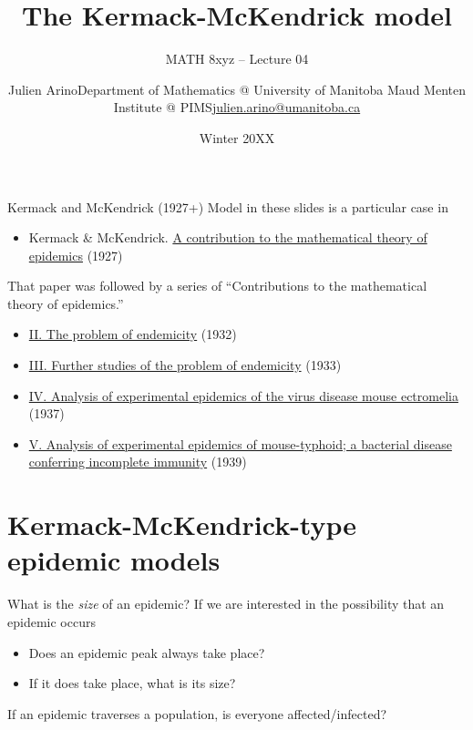 \documentclass[aspectratio=169]{beamer}\usepackage[]{graphicx}\usepackage[]{xcolor}
\title{The Kermack-McKendrick model}
\subtitle{MATH 8xyz -- Lecture 04}
\author{\texorpdfstring{Julien Arino\newline Department of Mathematics @ University of Manitoba \newline Maud Menten Institute @ PIMS\newline\url{julien.arino@umanitoba.ca}}{Julien Arino}}
\date{Winter 20XX}
\begin{document}


\begin{frame}{Kermack and McKendrick (1927+)}
Model in these slides is a particular case in
\begin{itemize}
  \item Kermack \& McKendrick. \href{https://doi.org/10.1098/rspa.1927.0118}{A contribution to the mathematical theory of epidemics} (1927) \end{itemize}
\vfill
That paper was followed by a series of ``Contributions to the mathematical theory of epidemics.''
\begin{itemize}
  \item \href{https://doi.org/10.1098/rspa.1932.0171}{II. The problem of endemicity} (1932)
  \item \href{https://doi.org/10.1098/rspa.1933.0106}{III. Further studies of the problem of endemicity} (1933) \nocite{KermackMcKendrick1932}
  \item \href{https://doi.org/10.1017/S0022172400034902}{IV. Analysis of experimental epidemics of the virus disease mouse ectromelia} (1937)
  \item \href{https://doi.org/10.1017/S0022172400011918}{V. Analysis of experimental epidemics of mouse-typhoid; a bacterial disease conferring incomplete immunity} (1939)
\end{itemize}
\end{frame}


\section{Kermack-McKendrick-type epidemic models}

\nocite{KermackMcKendrick1927}

\begin{frame}{What is the \emph{size} of an epidemic?}
\bbullet 
If we are interested in the possibility that an epidemic occurs
\begin{itemize}
  \item Does an epidemic peak always take place?
  \item If it does take place, what is its size?
\end{itemize}
\vfill
\bbullet If an epidemic traverses a population, is everyone affected/infected?
\end{frame}
\end{document}
